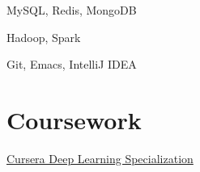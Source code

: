 \documentclass[]{hieudo-build}
\begin{document}
\begin{minipage}[t]{0.34\textwidth}
MySQL, Redis, MongoDB \\

\vspace{0.9em} %

Hadoop, Spark \\

\vspace{0.9em} %

Git, Emacs, IntelliJ IDEA \\
 

\sectionsep



\section{Coursework}
\href{https://www.coursera.org/account/accomplishments/specialization/B9VD5GVFH3J5}{Cursera Deep Learning Specialization }\\
\sectionsep




\end{minipage}
\end{document}
